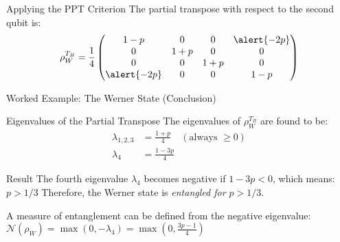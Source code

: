 \begin{frame}
  \begin{block}{Applying the PPT Criterion}
    The partial transpose with respect to the second qubit is:
    \[
      \rho_W^{T_B} = \frac{1}{4}
      \begin{pmatrix}
        1-p & 0 & 0 & \alert{-2p} \\
        0 & 1+p & 0 & 0 \\
        0 & 0 & 1+p & 0 \\
        \alert{-2p} & 0 & 0 & 1-p
      \end{pmatrix}
    \]
  \end{block}
\end{frame}


\begin{frame}{Worked Example: The Werner State (Conclusion)}
  \begin{block}{Eigenvalues of the Partial Transpose}
    The eigenvalues of $\rho_W^{T_B}$ are found to be:
    \begin{align*}
      \lambda_{1,2,3} &= \frac{1+p}{4} \quad (\text{always } \ge 0) \\
      \lambda_4 &= \frac{1-3p}{4}
    \end{align*}
  \end{block}
  \vspace{-2em}
  \pause
  \begin{alertblock}{Result}
    The fourth eigenvalue $\lambda_4$ becomes negative if $1-3p < 0$, which means:
    \( p > 1/3 \)
    Therefore, the Werner state is \emph{entangled for $p > 1/3$}.
  \pause

    A measure of entanglement can be defined from the negative eigenvalue:
    \(
      \mathcal{N}(\rho_W) = \max\left(0, -\lambda_4\right) = \max\left(0,
      \frac{3p-1}{4}\right)
    \)
  \end{alertblock}
\end{frame}


